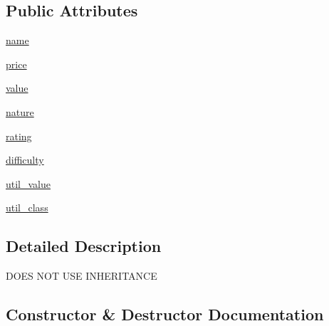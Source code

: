 \subsection*{Public Attributes}
\begin{DoxyCompactItemize}
\item 
\hyperlink{classgifts_1_1gift__uninherited_1_1_gift_abe76c25355d683ddd1e2383f139e4f8e}{name}
\item 
\hyperlink{classgifts_1_1gift__uninherited_1_1_gift_a0f92afe5566c82745e3b3759d2e9f775}{price}
\item 
\hyperlink{classgifts_1_1gift__uninherited_1_1_gift_aea65e2d06b96ec3ab267e4e8dd1e91ff}{value}
\item 
\hyperlink{classgifts_1_1gift__uninherited_1_1_gift_ac21294038fa6ce0cd1a192e303fc1920}{nature}
\item 
\hyperlink{classgifts_1_1gift__uninherited_1_1_gift_ae4594046255e648f0496354d1eb540ce}{rating}
\item 
\hyperlink{classgifts_1_1gift__uninherited_1_1_gift_ae679bef0b9d26aad227c52602b8575ee}{difficulty}
\item 
\hyperlink{classgifts_1_1gift__uninherited_1_1_gift_a640df8d6eb45f9027260eb8053bb6b43}{util\+\_\+value}
\item 
\hyperlink{classgifts_1_1gift__uninherited_1_1_gift_a7fd2164d8bd791fa524e82d2ef6316aa}{util\+\_\+class}
\end{DoxyCompactItemize}


\subsection{Detailed Description}
\begin{DoxyVerb}DOES NOT USE INHERITANCE\end{DoxyVerb}
 

\subsection{Constructor \& Destructor Documentation}
